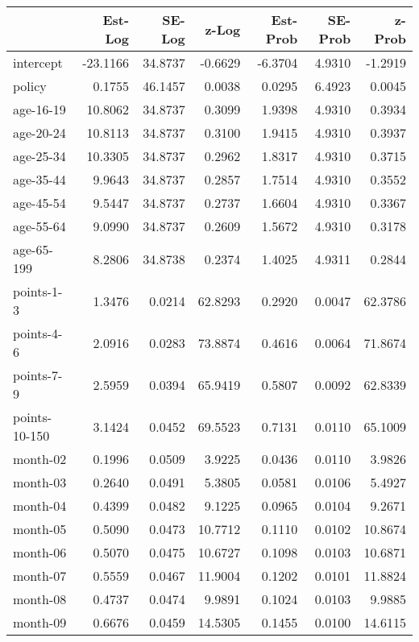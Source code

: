 \documentclass[10pt]{article}
\begin{document}
\begin{table}[ht]
\centering
\begin{tabular}{lrrrrrr}
  \hline
 & Est-Log & SE-Log & z-Log & Est-Prob & SE-Prob & z-Prob \\ 
  \hline
intercept & -23.1166 & 34.8737 & -0.6629 & -6.3704 & 4.9310 & -1.2919 \\ 
  policy & 0.1755 & 46.1457 & 0.0038 & 0.0295 & 6.4923 & 0.0045 \\ 
  age-16-19 & 10.8062 & 34.8737 & 0.3099 & 1.9398 & 4.9310 & 0.3934 \\ 
  age-20-24 & 10.8113 & 34.8737 & 0.3100 & 1.9415 & 4.9310 & 0.3937 \\ 
  age-25-34 & 10.3305 & 34.8737 & 0.2962 & 1.8317 & 4.9310 & 0.3715 \\ 
  age-35-44 & 9.9643 & 34.8737 & 0.2857 & 1.7514 & 4.9310 & 0.3552 \\ 
  age-45-54 & 9.5447 & 34.8737 & 0.2737 & 1.6604 & 4.9310 & 0.3367 \\ 
  age-55-64 & 9.0990 & 34.8737 & 0.2609 & 1.5672 & 4.9310 & 0.3178 \\ 
  age-65-199 & 8.2806 & 34.8738 & 0.2374 & 1.4025 & 4.9311 & 0.2844 \\ 
  points-1-3 & 1.3476 & 0.0214 & 62.8293 & 0.2920 & 0.0047 & 62.3786 \\ 
  points-4-6 & 2.0916 & 0.0283 & 73.8874 & 0.4616 & 0.0064 & 71.8674 \\ 
  points-7-9 & 2.5959 & 0.0394 & 65.9419 & 0.5807 & 0.0092 & 62.8339 \\ 
  points-10-150 & 3.1424 & 0.0452 & 69.5523 & 0.7131 & 0.0110 & 65.1009 \\ 
  month-02 & 0.1996 & 0.0509 & 3.9225 & 0.0436 & 0.0110 & 3.9826 \\ 
  month-03 & 0.2640 & 0.0491 & 5.3805 & 0.0581 & 0.0106 & 5.4927 \\ 
  month-04 & 0.4399 & 0.0482 & 9.1225 & 0.0965 & 0.0104 & 9.2671 \\ 
  month-05 & 0.5090 & 0.0473 & 10.7712 & 0.1110 & 0.0102 & 10.8674 \\ 
  month-06 & 0.5070 & 0.0475 & 10.6727 & 0.1098 & 0.0103 & 10.6871 \\ 
  month-07 & 0.5559 & 0.0467 & 11.9004 & 0.1202 & 0.0101 & 11.8824 \\ 
  month-08 & 0.4737 & 0.0474 & 9.9891 & 0.1024 & 0.0103 & 9.9885 \\ 
  month-09 & 0.6676 & 0.0459 & 14.5305 & 0.1455 & 0.0100 & 14.6115 \\ 

\end{tabular}
\end{table}
\end{document}
